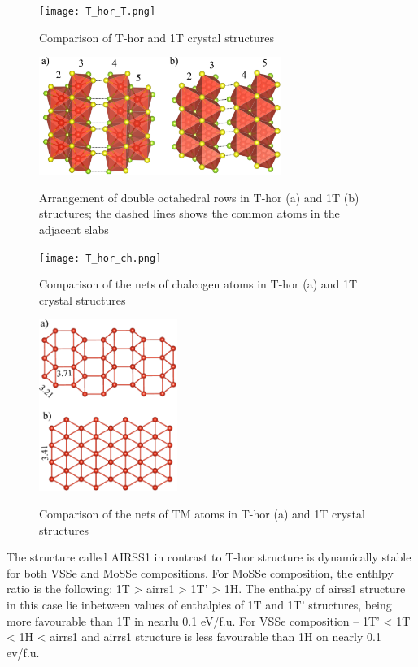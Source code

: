 \documentclass[a4paperm]{article}
\begin{document}
\begin{figure}[H]
	\texttt{[image: T\_hor\_T.png]} \\
	\caption{Comparison of T-hor and 1T crystal structures}
	\label{T_hor_T}
\end{figure}

\begin{figure}[H]
	\includegraphics[width=0.7\textwidth]{T_hor_slabs.png} \\
	\caption{Arrangement of double octahedral rows in T-hor (a) and 1T (b) structures; the dashed lines shows the common atoms in the adjacent slabs}
	\label{T_hor_slabs}
\end{figure}

\begin{figure}[H]
	\texttt{[image: T\_hor\_ch.png]} \\
	\caption{Comparison of the nets of chalcogen atoms in T-hor (a) and 1T crystal structures }
	\label{T_hor_ch}
\end{figure}

\begin{figure}[H]
	\includegraphics[width=0.4\textwidth]{T_hor_V.png} \\
	\caption{Comparison of the nets of TM atoms in T-hor (a) and 1T crystal structures }
	\label{T_hor_V}
\end{figure}


The structure called AIRSS1 in contrast to T-hor structure is dynamically stable for both VSSe and MoSSe compositions.
For MoSSe composition, the enthlpy ratio is the following: 1T > airrs1 > 1T' > 1H.
The enthalpy of airss1 structure in this case lie inbetween values of enthalpies of 1T and 1T' structures, being more favourable than 1T in nearlu 0.1 eV/f.u.
For VSSe composition -- 1T' < 1T < 1H < airrs1 and airrs1 structure is less favourable than 1H on nearly 0.1 ev/f.u.
\end{document}

